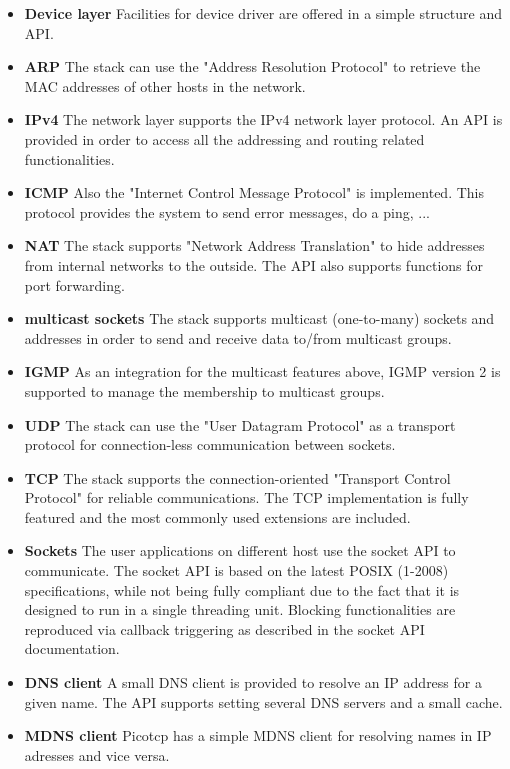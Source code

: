 \begin{itemize}
\item \textbf{Device layer} Facilities for device driver are offered in a simple
					structure and API.
\item \textbf{ARP} The stack can use the "Address Resolution Protocol" to retrieve
					the MAC addresses of other hosts in the network.
\item \textbf{IPv4} The network layer supports the IPv4 network layer
          protocol. An API is provided in order to access all the
          addressing and routing related functionalities.
\item \textbf{ICMP} Also the "Internet Control Message Protocol" is implemented. This
					protocol provides the system to send error messages, do a ping, ...
\item \textbf{NAT} The stack supports "Network Address Translation" to hide addresses
					from internal networks to the outside. The API also supports functions
					for port forwarding.
\item \textbf{multicast sockets} The stack supports multicast (one-to-many)
          sockets and addresses in order to send and receive data to/from
          multicast groups.
\item \textbf{IGMP} As an integration for the multicast features above, IGMP version 2
          is supported to manage the membership to multicast groups.
\item \textbf{UDP} The stack can use the "User Datagram Protocol" as a transport protocol
					for connection-less communication between sockets.
\item \textbf{TCP} The stack supports the connection-oriented "Transport Control Protocol"
					for reliable communications. The TCP implementation is fully
          featured and the most commonly used extensions are included.
\item \textbf{Sockets} The user applications on different host use the socket API to communicate.
					The socket API is based on the latest POSIX (1-2008)
          specifications, while not being fully compliant due to the fact
          that it is designed to run in a single threading unit. Blocking
          functionalities are reproduced via callback triggering as
          described in the socket API documentation.
\item \textbf{DNS client} A small DNS client is provided to resolve an IP address for a given name.
					The API supports setting several DNS servers and a small cache.
\item \textbf{MDNS client} Picotcp has a simple MDNS client for resolving names in IP adresses and vice versa.

\end{itemize}
